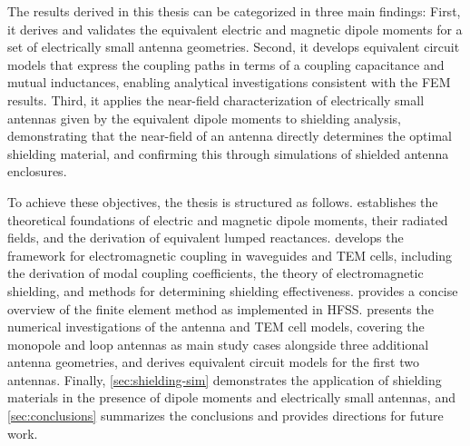 The results derived in this thesis can be categorized in three main findings: First, it derives and validates the equivalent electric and magnetic dipole moments for a set of electrically small antenna geometries. Second, it develops equivalent circuit models that express the coupling paths in terms of a coupling capacitance and mutual inductances, enabling analytical investigations consistent with the FEM results. Third, it applies the near-field characterization of electrically small antennas given by the equivalent dipole moments to shielding analysis, demonstrating that the near-field of an antenna directly determines the optimal shielding material, and confirming this through simulations of shielded antenna enclosures.

To achieve these objectives, the thesis is structured as follows.  establishes the theoretical foundations of electric and magnetic dipole moments, their radiated fields, and the derivation of equivalent lumped reactances.  develops the framework for electromagnetic coupling in waveguides and TEM cells, including the derivation of modal coupling coefficients, the theory of electromagnetic shielding, and methods for determining shielding effectiveness.  provides a concise overview of the finite element method as implemented in HFSS.  presents the numerical investigations of the antenna and TEM cell models, covering the monopole and loop antennas as main study cases alongside three additional antenna geometries, and derives equivalent circuit models for the first two antennas. Finally, \cref{sec:shielding-sim} demonstrates the application of shielding materials in the presence of dipole moments and electrically small antennas, and \cref{sec:conclusions} summarizes the conclusions and provides directions for future work.
